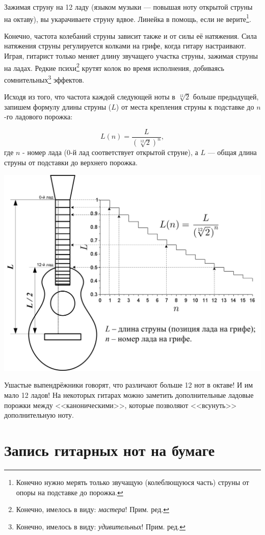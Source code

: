 Зажимая струну на 12 ладу (языком музыки --- повышая ноту открытой струны на октаву), вы укарачиваете струну вдвое. Линейка в помощь, если не верите\footnote{Конечно нужно мерять только звучащую (колеблющуюся часть) струны от опоры на подставке до порожка.}.

Конечно, частота колебаний струны зависит также и от силы её натяжения. Сила натяжения струны регулируется колками на грифе, когда гитару настраивают. Играя, гитарист только меняет длину звучащего участка струны, зажимая струны на ладах. Редкие психи\footnote{Конечно, имелось в виду: \emph{мастера}! Прим. ред.} крутят колок во время исполнения, добиваясь сомнительных\footnote{Конечно, имелось в виду: \emph{удивительных}! Прим. ред.} эффектов.

Исходя из того, что частота каждой следующей ноты в $\sqrt[12]{2}$ больше предыдущей, запишем формулу длины струны ($L$) от места крепления струны к подставке до $n$-го ладового порожка:

\[L(n)=\frac{L}{(\sqrt[12]{2})^n},\]
где $n$ - номер лада ($0$-й лад соответствует открытой струне), а $L$ --- общая длина струны от подставки до верхнего порожка.


\includegraphics{fig/string-length.png}

Ушастые выпендрёжники говорят, что различают больше 12 нот в октаве! И им мало 12 ладов! На некоторых гитарах можно заметить дополнительные ладовые порожки между <<каноническими>>, которые позволяют <<всунуть>> дополнительную ноту.


\section{Запись гитарных нот на бумаге}

